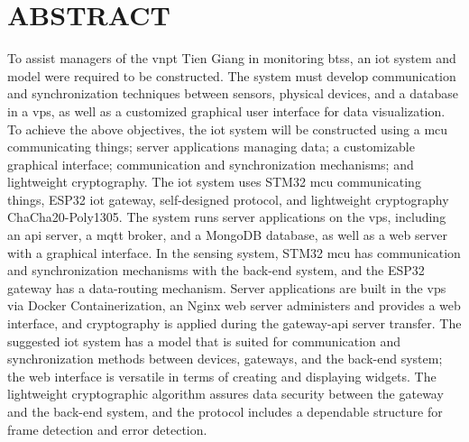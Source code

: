 \chapter*{ABSTRACT}
\label{Abstract-EN}

To assist managers of the \acrfull{vnpt} Tien Giang in monitoring \glspl{bts}, an \acrfull{iot} system and model were required to be constructed. The system must develop communication and synchronization techniques between sensors, physical devices, and a database in a \acrfull{vps}, as well as a customized graphical user interface for data visualization.
To achieve the above objectives, the \acrshort{iot} system will be constructed using a \acrfull{mcu} communicating things; server applications managing data; a customizable graphical interface; communication and synchronization mechanisms; and lightweight cryptography.
The \acrshort{iot} system uses STM32 \acrshort{mcu} communicating things, ESP32 \acrshort{iot} gateway, self-designed protocol, and lightweight cryptography ChaCha20-Poly1305. The system runs server applications on the \acrshort{vps}, including an \acrshort{api} server, a \acrfull{mqtt} broker, and a MongoDB database, as well as a web server with a graphical interface.
In the sensing system, STM32 \acrshort{mcu} has communication and synchronization mechanisms with the back-end system, and the ESP32 gateway has a data-routing mechanism. Server applications are built in the \acrshort{vps} via Docker Containerization, an Nginx web server administers and provides a web interface, and cryptography is applied during the gateway-\acrshort{api} server transfer.
The suggested \acrshort{iot} system has a model that is suited for communication and synchronization methods between devices, gateways, and the back-end system; the web interface is versatile in terms of creating and displaying widgets. The lightweight cryptographic algorithm assures data security between the gateway and the back-end system, and the protocol includes a dependable structure for frame detection and error detection.